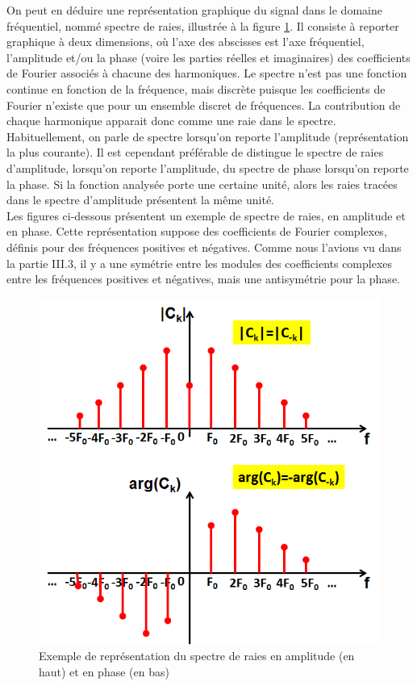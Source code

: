 	On peut en déduire une représentation graphique du signal dans le domaine fréquentiel, nommé spectre de raies, illustrée à la figure \ref{Fig:Spectre_raies}. Il consiste à reporter graphique à deux dimensions, où l'axe des abscisses est l'axe fréquentiel, l'amplitude et/ou la phase (voire les parties réelles et imaginaires) des coefficients de Fourier associés à chacune des harmoniques. Le spectre n'est pas une fonction continue en fonction de la fréquence, mais discrète puisque les coefficients de Fourier n'existe que pour un ensemble discret de fréquences. La contribution de chaque harmonique apparait donc comme une raie dans le spectre.\\
	Habituellement, on parle de spectre lorsqu'on reporte l'amplitude (représentation la plus courante). Il est cependant préférable de distingue le spectre de raies d'amplitude, lorsqu'on reporte l'amplitude, du spectre de phase lorsqu'on reporte la phase. Si la fonction analysée porte une certaine unité, alors les raies tracées dans le spectre d'amplitude présentent la même unité.\\
	Les figures ci-dessous présentent un exemple de spectre de raies, en amplitude et en phase. Cette représentation suppose des coefficients de Fourier complexes, définis pour des fréquences positives et négatives. Comme nous l'avions vu dans la partie III.3, il y a une symétrie entre les modules des coefficients complexes entre les fréquences positives et négatives, mais une antisymétrie pour la phase. 
	
	\begin{figure}[h!]
		\centering
		\includegraphics[scale=0.5]{images/Exemple_spectre.png}
		\caption{Exemple de représentation du spectre de raies en amplitude (en haut) et en phase (en bas)}	
		\label{Fig:Spectre_raies} 
	\end{figure}
	 

